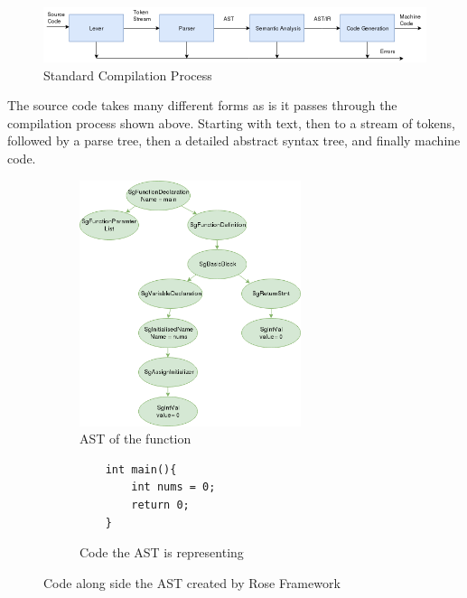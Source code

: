 \documentclass[bsc,frontabs,singlespacing,twoside,parskip,deptreport]{infthesis}
\begin{document}
\begin{figure}[!h]
    \centering
    \includegraphics[width=\textwidth]{images/Compilation-process.png}
    \caption{Standard Compilation Process}
    \label{fig:comp_proc}
\end{figure}
The source code takes many different forms as is it passes through the compilation process shown above. Starting with text, then to a stream of tokens, followed by a parse tree, then a detailed abstract syntax tree, and finally machine code. 

\begin{figure}[H]
    \begin{subfigure}[b]{0.5\textwidth}
        \centering
        \includegraphics[height=7.2cm]{images/ast-example.png}
        \caption{AST of the function}
        \label{fig:ast-example-AST}
    \end{subfigure}
    \hfill
    \begin{subfigure}[b]{0.5\textwidth}
        \centering
        \begin{verbatim}
    int main(){
        int nums = 0;
        return 0;
    }
        \end{verbatim}
        \caption{Code the AST is representing}
        \label{fig:ast-example-code}
    \end{subfigure}
    \vspace{-0.5cm}
    \caption{Code along side the AST created by Rose Framework }
    \label{fig:ast-example}
\end{figure}
\end{document}
